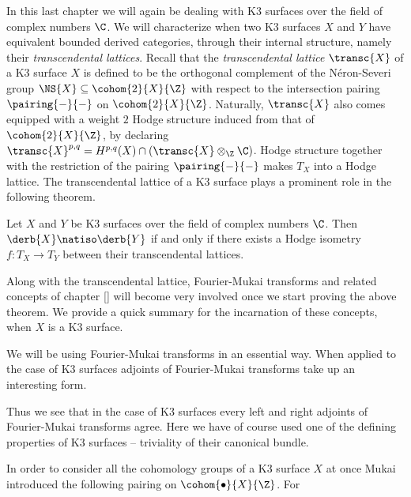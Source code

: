 In this last chapter we will again be dealing with K3 surfaces over the field of complex numbers $\C$. We will characterize when two K3 surfaces $X$ and $Y$ have equivalent bounded derived categories, through their internal structure, namely their \emph{transcendental lattices}. Recall that the \emph{transcendental lattice} $\transc{X}$ of a K3 surface $X$ is defined to be the orthogonal complement of the Néron-Severi group $\NS{X} \subseteq \cohom{2}{X}{\Z}$ with respect to the intersection pairing $\pairing{-}{-}$ on $\cohom{2}{X}{\Z}$.
Naturally, $\transc{X}$ also comes equipped with a weight $2$ Hodge structure induced from that of $\cohom{2}{X}{\Z}$, by declaring $\transc{X}^{p,q} = H^{p,q}(X) \cap (\transc{X} \otimes_\Z \C)$. Hodge structure together with the restriction of the pairing $\pairing{-}{-}$ makes $T_X$ into a Hodge lattice. The transcendental lattice of a K3 surface plays a prominent role in the following theorem. 


\begin{theorem}
    \label{Derived Torelli}
    Let $X$ and $Y$ be K3 surfaces over the field of complex numbers $\C$. Then $\derb{X} \natiso \derb{Y}$ if and only if there exists a Hodge isometry $f\colon T_X \to T_Y$ between their transcendental lattices.
\end{theorem}

Along with the transcendental lattice, Fourier-Mukai transforms and related concepts of chapter \ref{} will become very involved once we start proving the above theorem. We provide a quick summary for the incarnation of these concepts, when $X$ is a K3 surface. 



We will be using Fourier-Mukai transforms in an essential way. When applied to the case of K3 surfaces adjoints of Fourier-Mukai transforms take up an interesting form.

Thus we see that in the case of K3 surfaces every left and right adjoints of Fourier-Mukai transforms agree.
Here we have of course used one of the defining properties of K3 surfaces -- triviality of their canonical bundle.


In order to consider all the cohomology groups of a K3 surface $X$ at once Mukai introduced the following pairing on $\cohom{\bullet}{X}{\Z}$. For 

